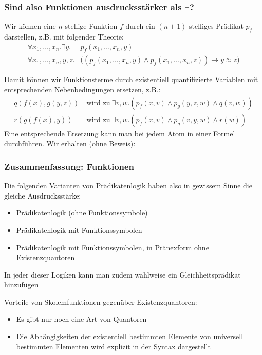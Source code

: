\documentclass[aspectratio=1610,onlymath]{beamer}
\begin{document}
\begin{frame}\frametitle{Sind also Funktionen ausdrucksstärker als $\exists$?}
\pause

Wir können eine $n$-stellige Funktion $f$ durch ein $(n+1)$-stelliges Prädikat $p_f$
darstellen, z.B. mit folgender Theorie:
\begin{align*}
\forall x_1,\ldots, x_n.\exists y.&p_f(x_1,\ldots,x_n,y)\\
\forall x_1,\ldots, x_n,y,z.&\big((p_f(x_1,\ldots,x_n,y)\wedge p_f(x_1,\ldots,x_n,z))\to y\approx z\big)
\end{align*}\pause

Damit können wir Funktionsterme durch existentiell quantifizierte Variablen mit
entsprechenden Nebenbedingungen ersetzen, z.B.:
\begin{align*}
q(f(x),g(y,z)) &\ \text{wird zu}\ \exists v,w.(p_f(x,v)\wedge p_g(y,z,w)\wedge q(v,w))\\
r(g(f(x),y)) &\ \text{wird zu}\ \exists v,w.(p_f(x,v)\wedge p_g(v,y,w)\wedge r(w))
\end{align*}\pause
Eine entsprechende Ersetzung kann man bei jedem Atom in einer Formel durchführen. Wir erhalten (ohne Beweis):


\end{frame}

\begin{frame}\frametitle{Zusammenfassung: Funktionen}

Die folgenden Varianten von Prädikatenlogik haben also in gewissem Sinne die \alert{gleiche
Ausdrucksstärke:}
\begin{itemize}
\item Prädikatenlogik (ohne Funktionssymbole)
\item Prädikatenlogik mit Funktionssymbolen
\item Prädikatenlogik mit Funktionssymbolen, in Pränexform ohne Existenzquantoren
\end{itemize}
In jeder dieser Logiken kann man zudem wahlweise ein Gleichheitsprädikat hinzufügen
\bigskip\pause

\alert{Vorteile von Skolemfunktionen gegenüber Existenzquantoren:}
\begin{itemize}
\item Es gibt nur noch eine Art von Quantoren
\item Die Abhängigkeiten der existentiell bestimmten Elemente von universell bestimmten Elementen wird explizit in der Syntax dargestellt
\end{itemize}


\end{frame}
\end{document}
